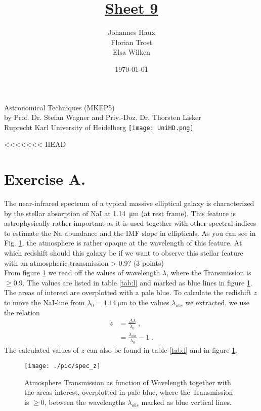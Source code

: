 \documentclass[11pt,a4paper,twoside]{article}
\title{\LARGE \underline {Sheet 9}}
\author{Johannes Haux \\ Florian Trost \\ Elsa Wilken}
\date{\today}
\begin{document}
\maketitle
\thispagestyle{empty}

\begin{center}
  Astronomical Techniques (MKEP5) \\
  \baselineskip35pt
  by Prof. Dr. Stefan Wagner and Priv.-Doz. Dr. Thorsten Lisker \\
  \baselineskip60pt
  Ruprecht Karl University of Heidelberg
\vskip 40pt
\texttt{[image: UniHD.png]}

\end{center}

\newpage
\setcounter{page}{1}		%

<<<<<<< HEAD
\section*{Exercise A.}

The near-infrared spectrum of a typical massive elliptical galaxy is
characterized by the stellar absorption of NaI at \SI{1.14}{\micro\meter} (at
rest frame). This feature is astrophysically rather important as it is used
together with other spectral indices to estimate the Na abundance and the IMF
slope in ellipticals.  As you can see in Fig. \ref{fig:z}, the atmosphere is
rather opaque at the wavelength of this feature. At which redshift should this
galaxy be if we want to observe this stellar feature with an atmospheric
transmission > 0.9? (3 points)\\

From figure \ref{fig:z} we read off the values of wavelength $\lambda$, where
the Transmission is $\geq 0.9$. The values are listed in table \ref{tab:l} and
marked as blue lines in figure \ref{fig:z}. The areas of interest are
overplotted with a pale blue. To calculate the redishift $z$ to move the
NaI-line from $\lambda_0=\SI{1.14}{\micro\meter}$ to the values $\lambda_{obs}$
we extracted, we use the relation
\begin{align*}
    z   &= \frac{\Delta \lambda}{\lambda_0}\;, \\
        &= \frac{\lambda_{obs}}{\lambda_0} -1\;.
\end{align*}
The calculated values of $z$ can also be found in table \ref{tab:l} and in 
figure \ref{fig:z}.

\begin{figure}[h!]
\centering
\texttt{[image: ./pic/spec\_z]}
\caption{Atmosphere Transmission as function of Wavelength together with the
         areas interest, overplotted in pale blue, where the Transmission is
         $\geq 0$, between the wavelengths $\lambda_{obs}$ marked as blue
         vertical lines.}
\label{fig:z}
\end{figure}
\end{document}

